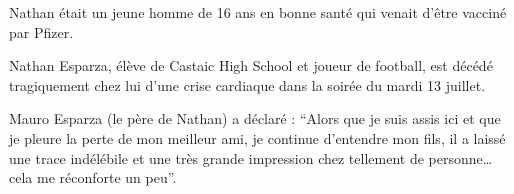 Nathan était un jeune homme de 16 ans en bonne santé qui venait d'être vacciné
par Pfizer.

Nathan Esparza, élève de Castaic High School et joueur de football, est décédé
tragiquement chez lui d'une crise cardiaque dans la soirée du mardi 13 juillet.

Mauro Esparza (le père de Nathan) a déclaré : “Alors que je suis assis ici et
que je pleure la perte de mon meilleur ami, je continue d'entendre mon fils, il
a laissé une trace indélébile et une très grande impression chez tellement de
personne… cela me réconforte un peu”.

